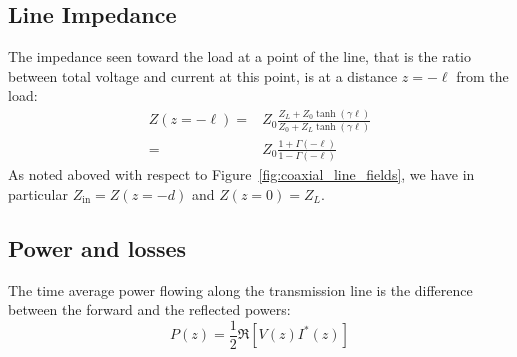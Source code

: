 \subsection{Line Impedance}
The impedance seen toward the load at a point of the line, that is the ratio between total voltage and current at this point, is at a distance $z=-\ell$ from the load:
\begin{subequations}
	\begin{align}
Z(z=-\ell) 
	=& Z_0 \frac{Z_L + Z_0 \tanh( \gamma \ell)}{Z_0 + Z_L \tanh(\gamma \ell)} \\
	=& Z_0 \frac{1 + \Gamma(-\ell) }{1 - \Gamma(-\ell) }
	\end{align}
\end{subequations}
As noted aboved with respect to Figure~\ref{fig:coaxial_line_fields}, we have in particular $Z_{\mathrm{in}}=Z(z=-d)$ and $Z(z=0)=Z_L$.

\subsection{Power and losses}\label{sec:power_and_losses}
The time average power flowing along the transmission line is the difference between the forward and the reflected powers:
\begin{equation}
P (z) = \frac{1}{2} \Re\left[V(z) I^*(z)\right] 
\label{eq:power_time_average_general}
\end{equation}


